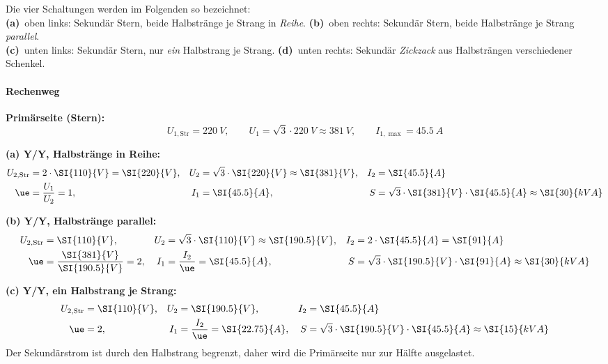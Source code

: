 \begin{hinweis}
Die vier Schaltungen werden im Folgenden so bezeichnet:\\
\textbf{(a)}~oben links: Sekundär Stern, beide Halbstränge je Strang in \emph{Reihe}.\quad
\textbf{(b)}~oben rechts: Sekundär Stern, beide Halbstränge je Strang \emph{parallel}.\\
\textbf{(c)}~unten links: Sekundär Stern, nur \emph{ein} Halbstrang je Strang.\quad
\textbf{(d)}~unten rechts: Sekundär \emph{Zickzack} aus Halbsträngen verschiedener Schenkel.
\end{hinweis}

\paragraph{Rechenweg}

\textbf{Primärseite (Stern):}
\begin{equation*}
  U_{1,\mathrm{Str}} = \SI{220}{V}, \qquad
  U_{1} = \sqrt{3}\cdot\SI{220}{V} \approx \SI{381}{V}, \qquad
  I_{1,\max} = \SI{45.5}{A}
\end{equation*}

\textbf{(a) Y/Y, Halbstränge in Reihe:}
\begin{align*}
  U_{2,\mathrm{Str}} &= 2\cdot\SI{110}{V} = \SI{220}{V}, &
  U_2 &= \sqrt{3}\cdot\SI{220}{V} \approx \SI{381}{V}, &
  I_2 &= \SI{45.5}{A}\\
  \ue &= \frac{U_1}{U_2} = 1, &
  I_1 &= \SI{45.5}{A}, &
  S &= \sqrt{3}\cdot\SI{381}{V}\cdot\SI{45.5}{A} \approx \SI{30}{kVA}
\end{align*}

\textbf{(b) Y/Y, Halbstränge parallel:}
\begin{align*}
  U_{2,\mathrm{Str}} &= \SI{110}{V}, &
  U_2 &= \sqrt{3}\cdot\SI{110}{V} \approx \SI{190.5}{V}, &
  I_2 &= 2\cdot\SI{45.5}{A} = \SI{91}{A}\\
  \ue &= \frac{\SI{381}{V}}{\SI{190.5}{V}} = 2, &
  I_1 &= \frac{I_2}{\ue} = \SI{45.5}{A}, &
  S &= \sqrt{3}\cdot\SI{190.5}{V}\cdot\SI{91}{A} \approx \SI{30}{kVA}
\end{align*}

\textbf{(c) Y/Y, ein Halbstrang je Strang:}
\begin{align*}
  U_{2,\mathrm{Str}} &= \SI{110}{V}, &
  U_2 &= \SI{190.5}{V}, &
  I_2 &= \SI{45.5}{A}\\
  \ue &= 2, &
  I_1 &= \frac{I_2}{\ue} = \SI{22.75}{A}, &
  S &= \sqrt{3}\cdot\SI{190.5}{V}\cdot\SI{45.5}{A} \approx \SI{15}{kVA}
\end{align*}
Der Sekundärstrom ist durch den Halbstrang begrenzt, daher wird die Primärseite nur zur Hälfte ausgelastet.

